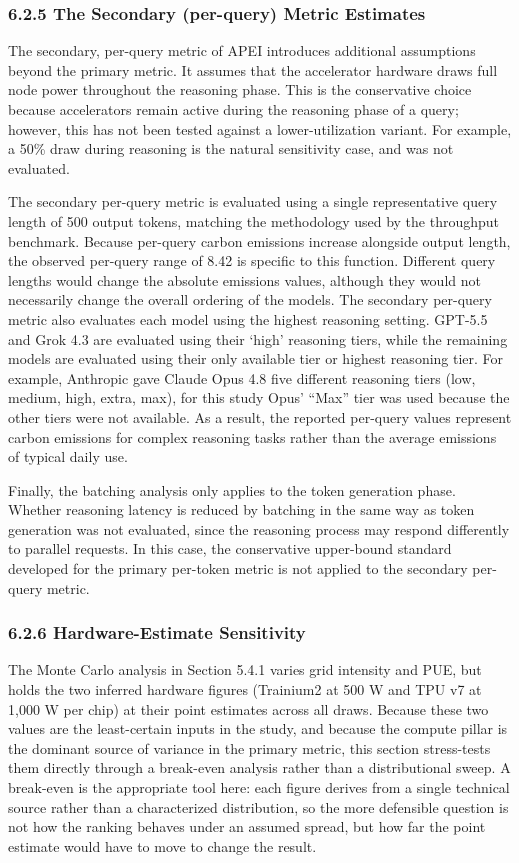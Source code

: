\documentclass[11pt]{article}
\begin{document}
\subsubsection*{6.2.5 The Secondary (per-query) Metric Estimates}

The secondary, per-query metric of APEI introduces additional assumptions beyond the primary metric. It assumes that the accelerator hardware draws full node power throughout the reasoning phase. This is the conservative choice because accelerators remain active during the reasoning phase of a query; however, this has not been tested against a lower-utilization variant. For example, a 50\% draw during reasoning is the natural sensitivity case, and was not evaluated.

The secondary per-query metric is evaluated using a single representative query length of 500 output tokens, matching the methodology used by the throughput benchmark. Because per-query carbon emissions increase alongside output length, the observed per-query range of 8.42 is specific to this function. Different query lengths would change the absolute emissions values, although they would not necessarily change the overall ordering of the models. The secondary per-query metric also evaluates each model using the highest reasoning setting. GPT-5.5 and Grok 4.3 are evaluated using their `high' reasoning tiers, while the remaining models are evaluated using their only available tier or highest reasoning tier. For example, Anthropic gave Claude Opus 4.8 five different reasoning tiers (low, medium, high, extra, max), for this study Opus' ``Max'' tier was used because the other tiers were not available. As a result, the reported per-query values represent carbon emissions for complex reasoning tasks rather than the average emissions of typical daily use.

Finally, the batching analysis only applies to the token generation phase. Whether reasoning latency is reduced by batching in the same way as token generation was not evaluated, since the reasoning process may respond differently to parallel requests. In this case, the conservative upper-bound standard developed for the primary per-token metric is not applied to the secondary per-query metric.

\subsubsection*{6.2.6 Hardware-Estimate Sensitivity}

The Monte Carlo analysis in Section 5.4.1 varies grid intensity and PUE, but holds the two inferred hardware figures (Trainium2 at 500 W and TPU v7 at 1{,}000 W per chip) at their point estimates across all draws. Because these two values are the least-certain inputs in the study, and because the compute pillar is the dominant source of variance in the primary metric, this section stress-tests them directly through a break-even analysis rather than a distributional sweep. A break-even is the appropriate tool here: each figure derives from a single technical source rather than a characterized distribution, so the more defensible question is not how the ranking behaves under an assumed spread, but how far the point estimate would have to move to change the result.
\end{document}

